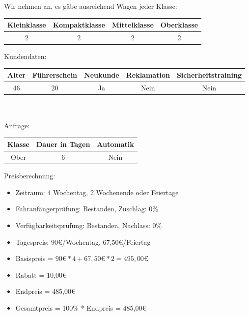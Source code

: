 Wir nehmen an, es gäbe ausreichend Wagen jeder Klasse:

\begin{tabular}{|c|c|c|c|}
	\hline \textbf{Kleinklasse} & \textbf{Kompaktklasse} & \textbf{Mittelklasse} & \textbf{Oberklasse}  \\ 
	\hline 2 & 2 & 2 & 2 \\ 
	\hline 
\end{tabular}

Kundendaten:\\
\begin{tabular}{|c|c|c|c|c|}
	\hline \textbf{Alter} & \textbf{Führerschein} & \textbf{Neukunde} & \textbf{Reklamation} & \textbf{Sicherheitstraining} \\ 
	\hline 46 & 20 & Ja & Nein & Nein \\ 
	\hline 
\end{tabular} 
\\\\
Anfrage:\\
\begin{tabular}{|c|c|c|}
	\hline \textbf{Klasse} & \textbf{Dauer in Tagen} & \textbf{Automatik} \\ 
	\hline Ober & 6 & Nein \\ 
	\hline 
\end{tabular}

Preisberechnung:
\begin{itemize}
	\item Zeitraum: 4 Wochentag, 2 Wochenende oder Feiertage
	\item Fahranfängerprüfung: Bestanden, Zuschlag: 0\%
	\item Verfügbarkeitsprüfung: Bestanden, Nachlass: 0\%
	
	\item Tagespreis: 90€/Wochentag, 67,50€/Feiertag
	\item Basispreis = $90€ * 4 + 67,50€ * 2 = 495,00€$
	\item Rabatt = 10,00€
	\item Endpreis = 485,00€
	\item Gesamtpreis = 100\% * Endpreis = 485,00€
	
\end{itemize}


